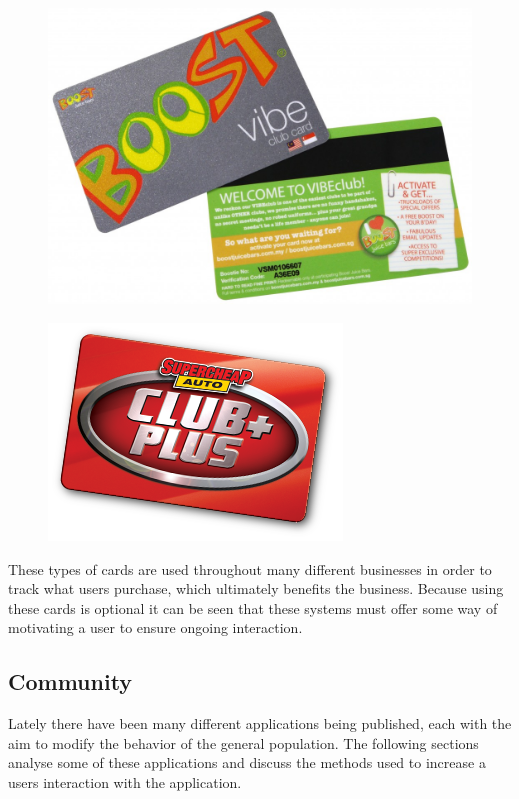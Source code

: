 \documentclass[a4paper,12pt]{article}
\begin{document}
\begin{figure}[!ht]
	\centering
	\begin{minipage}{.5\textwidth}
	  \centering
	  \includegraphics[width=.6\linewidth]{./images/clubCard-boost}
	  \label{clubCard-boost}
	\end{minipage}%
	\begin{minipage}{.5\textwidth}
	  \centering
	  \includegraphics[width=.6\linewidth]{./images/clubCard-sca}
	  \label{clubCard-sca}
	\end{minipage}
\end{figure}

\par
These types of cards are used throughout many different businesses in order to track what users purchase, which ultimately benefits the business. 
Because using these cards is optional it can be seen that these systems must offer some way of motivating a user to ensure ongoing interaction.

\subsection{Community}
Lately there have been many different applications being published, each with the aim to modify the behavior of the general population. 
The following sections analyse some of these applications and discuss the methods used to increase a users interaction with the application.
\end{document}

